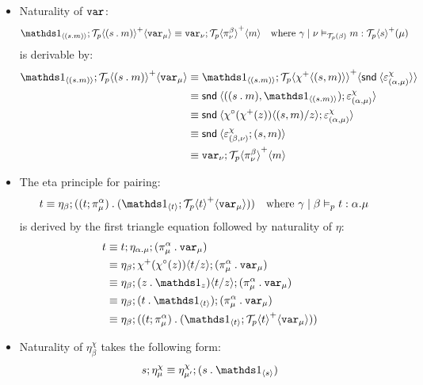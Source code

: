 \documentclass[10pt]{article}
\theoremstyle{definition}
\newcommand\dsd[1]{\ensuremath{\mathsf{#1}}}
\newcommand{\app}[2]{\ensuremath{#1 \: #2}}
\newcommand{\snd}[1]{\app{\dsd{snd}}{#1}}
\newcommand\TermTwoT[5]{\ensuremath{#1 \mid #3 \vDash_{#5} {#2} : #4}}
\newcommand\TrPlus[2]{\ensuremath{{#1}^+(#2)}}
\newcommand\TrCirc[2]{\ensuremath{{#1}^\circ(#2)}}
\newcommand\El[2]{\mathcal{T}_{#1}(#2)}
\newcommand\ApEl[2]{\mathcal{T}_{#1}\langle#2\rangle}
\newcommand\bdot[0]{\mathbin{.}}
\newcommand\ap[2]{\ensuremath{#1 \langle #2 \rangle }}
\newcommand\ApPlus[2]{\ensuremath{{#1}^+ \langle #2 \rangle }}
\begin{document}
\begin{itemize}
\item Naturality of $\mathtt{var}_{}$:
\begin{align}
\label{beta-var}
\ApOne{(s \bdot m)};\ApPlus{\ApEl{p}{(s \bdot m)}}{\var{\mu}} &\equiv \var{\nu};\ApPlus{\ApEl{p}{\pi^\beta_\nu}}{m}  && \text{where } \TermTwoT{\gamma}{m}{\nu}{\TrPlus{\ApEl{p}{s}}{\mu}}{\El{p}{\beta}}
\end{align}
is derivable by:
\begin{align*}
\ApOne{(s \bdot m)};\ApPlus{\ApEl{p}{(s \bdot m)}}{\var{\mu}} 
&\equiv \ApOne{(s \bdot m)};\ApPlus{\ApEl{p}{\ApPlus{\chi}{(s, m)}}}{\ap \snd {\varepsilon^\chi_{(\alpha, \mu)}}} \\
&\equiv \ap \snd {((s \bdot m), \ApOne{(s \bdot m)});\varepsilon^\chi_{(\alpha, \mu)}} \\
&\equiv \ap \snd {\ap{\TrCirc{\chi}{\TrPlus{\chi}{z}}}{(s, m)/z};\varepsilon^\chi_{(\alpha, \mu)}} \\
&\equiv \ap \snd {\varepsilon^\chi_{(\beta, \nu)};(s, m)} \\
&\equiv \var{\nu}; \ApPlus{\ApEl{p}{\pi^\beta_{\nu}}}{m} 
\end{align*}

\item The eta principle for pairing:
\begin{align}
\label{eta-pi-var}
t &\equiv \eta_\beta;((t;\pi_\mu^\alpha) \bdot (\ApOne{t}; \ApPlus{\ApEl{p}{t}}{\var{\mu}})) && \text{where } \TermTwoT{\gamma}{t}{\beta}{\alpha.\mu}{p}
\end{align}
is derived by the first triangle equation followed by naturality of $\eta$:
\begin{align*}
t &\equiv t;\eta_{\alpha.\mu};(\pi_\mu^\alpha \bdot \var{\mu}) \\
&\equiv \eta_\beta;\ap{\TrPlus{\chi}{\TrCirc{\chi}{z}}}{t/z};(\pi_\mu^\alpha \bdot \var{\mu}) \\
&\equiv \eta_\beta;\ap{(z \bdot \One_z)}{t/z};(\pi_\mu^\alpha \bdot \var{\mu}) \\
&\equiv \eta_\beta;(t \bdot \ApOne{t});(\pi_\mu^\alpha \bdot \var{\mu}) \\
&\equiv \eta_\beta;((t;\pi_\mu^\alpha) \bdot (\ApOne{t}; \ApPlus{\ApEl{p}{t}}{\var{\mu}})) \\
\end{align*}

\item Naturality of $\eta^\chi_\beta$ takes the following form:
\begin{align*}
s;\eta^\chi_\mu \equiv \eta^\chi_{\mu'} ; (s \bdot \ApOne{s})
\end{align*}

\end{itemize}
\end{document}
